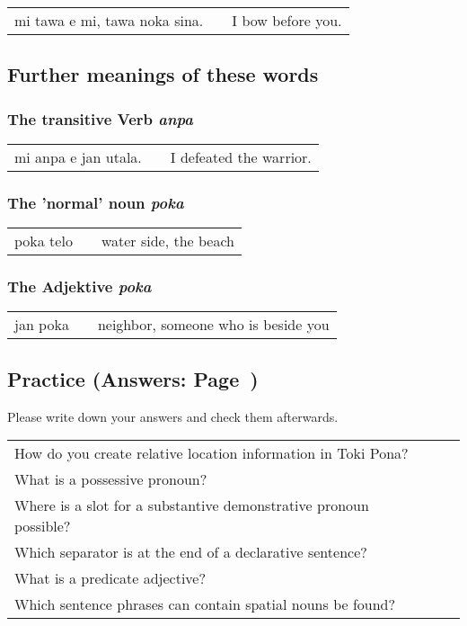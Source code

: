 \begin{supertabular}{p{5,5cm}|ll}
    mi tawa e mi, tawa noka sina. &  & I bow before you. \\
\end{supertabular}

\subsection*{Further meanings of these words}
\subsubsection*{The transitive Verb \textit{anpa}}

\begin{supertabular}{p{5,5cm}|ll}
    mi anpa e jan utala. &  & I defeated the warrior. \\
\end{supertabular}

\subsubsection*{The 'normal' noun \textit{poka}}

\begin{supertabular}{p{5,5cm}|ll}
    poka telo &  & water side, the beach \\
\end{supertabular}

\subsubsection*{The Adjektive \textit{poka}}
\begin{supertabular}{p{5,5cm}|ll}
    jan poka &  & neighbor, someone who is beside you \\
\end{supertabular}

\newpage

\subsection*{Practice (Answers: Page~\pageref{'other_prepositions'})}
Please write down your answers and check them afterwards.

\begin{supertabular}{p{5,5cm}|ll}
    How do you create relative location information in Toki Pona?     &  & \\
    What is a possessive pronoun?                                     &  & \\
    Where is a slot for a substantive demonstrative pronoun possible? &  & \\
    Which separator is at the end of a declarative sentence?          &  & \\
    What is a predicate adjective?                                    &  & \\
    Which sentence phrases can contain spatial nouns be found?        &  & \\
\end{supertabular}


